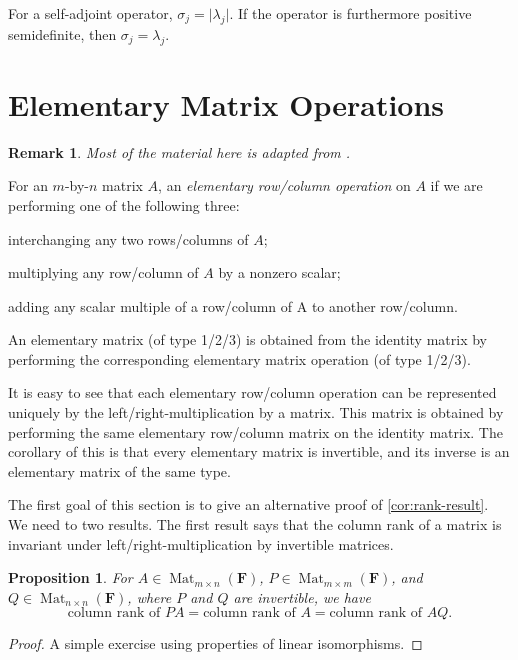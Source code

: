 \documentclass[11pt]{article}
\numberwithin{equation}{section}
\theoremstyle{plain-star}
\newtheorem{prop}[equation]{Proposition}
\theoremstyle{definition-star}
\theoremstyle{remark-star}
\newtheorem*{rem*}{Remark}
\theoremstyle{plain-star}
\newcommand{\F}{\mathbf{F}}
\newcommand{\Mat}{\operatorname{Mat}}
\newcommand{\abs}[1]{\lvert #1 \rvert}
\newcommand{\df}[1]{\textit{#1}}
\begin{document}
For a self-adjoint operator, $\sigma_j = \abs{\lambda_j}$. If the operator is furthermore positive semidefinite, then $\sigma_j = \lambda_j$.

\newpage
\appendix
\section{Elementary Matrix Operations}\label{sec:elem-mat-op}
\begin{rem*}
    Most of the material here is adapted from \cite[Chapter 3]{friedberg2003linear}.
\end{rem*}

For an $m$-by-$n$ matrix $A$, an \df{elementary row/column operation} on $A$ if we are performing one of the following three: 
\begin{description}[font=\sffamily]
    \item[Type 1] interchanging any two rows/columns of $A$; 
    \item[Type 2] multiplying any row/column of $A$ by a nonzero scalar; 
    \item[Type 3] adding any scalar multiple of a row/column of A to another row/column.
\end{description}

An elementary matrix (of type 1/2/3) is obtained from the identity matrix by performing the corresponding elementary matrix operation (of type 1/2/3).

It is easy to see that each elementary row/column operation can be represented uniquely by the left/right-multiplication by a matrix. This matrix is obtained by performing the same elementary row/column matrix on the identity matrix. The corollary of this is that every elementary matrix is invertible, and its inverse is an elementary matrix of the same type.

The first goal of this section is to give an alternative proof of \cref{cor:rank-result}. We need to two results. The first result says that the column rank of a matrix is invariant under left/right-multiplication by invertible matrices.
\begin{prop}\label{prop:rank-same}
    For $A \in \Mat_{m\times n}(\F)$, $P \in \Mat_{m \times m}(\F)$, and $Q \in \Mat_{n \times n}(\F)$, where $P$ and $Q$ are invertible, we have \[
        \text{column rank of } PA = \text{column rank of } A = \text{column rank of } AQ.
    \]
\end{prop}
\begin{proof}
    A simple exercise using properties of linear isomorphisms.
\end{proof}
\end{document}
